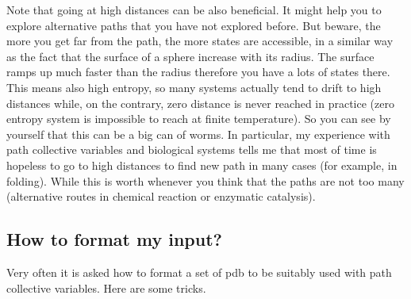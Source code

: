Note that going at high distances can be also beneficial. It might help you to explore alternative paths that you have not explored before. But beware, the more you get far from the path, the more states are accessible, in a similar way as the fact that the surface of a sphere increase with its radius. The surface ramps up much faster than the radius therefore you have a lots of states there. This means also high entropy, so many systems actually tend to drift to high distances while, on the contrary, zero distance is never reached in practice (zero entropy system is impossible to reach at finite temperature). So you can see by yourself that this can be a big can of worms. In particular, my experience with path collective variables and biological systems tells me that most of time is hopeless to go to high distances to find new path in many cases (for example, in folding). While this is worth whenever you think that the paths are not too many (alternative routes in chemical reaction or enzymatic catalysis).\hypertarget{belfast-2_belfast-2-pcvs-format}{}\subsection{How to format my input?}\label{belfast-2_belfast-2-pcvs-format}
Very often it is asked how to format a set of pdb to be suitably used with path collective variables. Here are some tricks.
